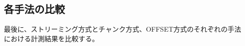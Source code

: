 \documentclass[../../../main]{subfiles}
\begin{document}
    \subsection{各手法の比較}\label{subsec:result-each-way}

    最後に、ストリーミング方式とチャンク方式、OFFSET方式のそれぞれの手法における計測結果を比較する。

    
    
\end{document}
